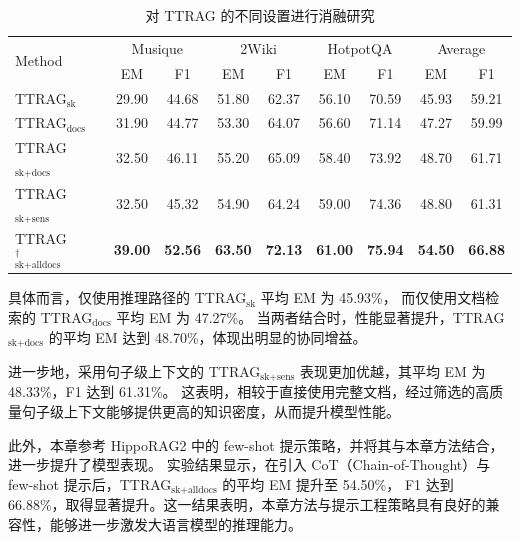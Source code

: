 \begin{table}[htbp]
  \centering
  \caption{对 TTRAG 的不同设置进行消融研究}
  \label{table:ablation}
  \vspace{0.5em}\centering\wuhao
  \begin{tabular}{@{}lcccccccc@{}}
  \toprule[1.5pt]
  \multirow{2}{*}{Method} & \multicolumn{2}{c}{Musique} & \multicolumn{2}{c}{2Wiki} & \multicolumn{2}{c}{HotpotQA} & \multicolumn{2}{c}{Average} \\
   & EM & F1 & EM & F1 & EM & F1 & EM & F1 \\
  \midrule[1pt]
  TTRAG$_\text{sk}$           & 29.90 & 44.68 & 51.80 & 62.37 & 56.10 & 70.59 & 45.93 & 59.21 \\
  TTRAG$_\text{docs}$           & 31.90 & 44.77 & 53.30 & 64.07 & 56.60 & 71.14 & 47.27 & 59.99 \\
  TTRAG$_\text{sk+docs}$      & 32.50 & 46.11 & 55.20 & 65.09 & 58.40 & 73.92 & 48.70 & 61.71 \\
  TTRAG$_\text{sk+sens}$      & 32.50 & 45.32 & 54.90 & 64.24 & 59.00 & 74.36 & 48.80 & 61.31 \\
  TTRAG$_\text{sk+alldocs}^\dagger$ & \textbf{39.00} & \textbf{52.56} & \textbf{63.50} & \textbf{72.13} & \textbf{61.00} & \textbf{75.94} & \textbf{54.50} & \textbf{66.88} \\
  \bottomrule[1.5pt]
  \end{tabular}%
\end{table}

具体而言，仅使用推理路径的 TTRAG$_{\text{sk}}$ 平均 EM 为 45.93\%，
而仅使用文档检索的 TTRAG$_{\text{docs}}$ 平均 EM 为 47.27\%。
当两者结合时，性能显著提升，TTRAG$_{\text{sk+docs}}$ 的平均 EM 达到 48.70\%，体现出明显的协同增益。

进一步地，采用句子级上下文的 TTRAG$_{\text{sk+sens}}$ 表现更加优越，其平均 EM 为 48.33\%，F1 达到 61.31\%。
这表明，相较于直接使用完整文档，经过筛选的高质量句子级上下文能够提供更高的知识密度，从而提升模型性能。

此外，本章参考 HippoRAG2 中的 few-shot 提示策略，并将其与本章方法结合，进一步提升了模型表现。
实验结果显示，在引入 CoT（Chain-of-Thought）与 few-shot 提示后，TTRAG$_{\text{sk+alldocs}}$ 的平均 EM 提升至 54.50\%，
F1 达到 66.88\%，取得显著提升。这一结果表明，本章方法与提示工程策略具有良好的兼容性，能够进一步激发大语言模型的推理能力。

